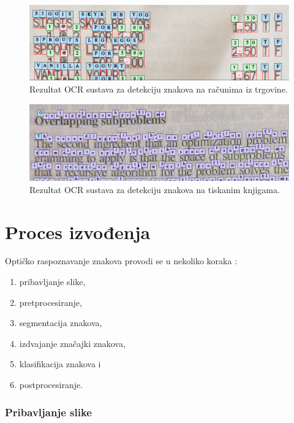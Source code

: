 \documentclass[times, utf8, zavrsni]{fer}
\begin{document}
\begin{figure}[htb]
    \centering
    \includegraphics[width=\textwidth]{images/receipt-example-01.png}
    \caption{Rezultat OCR sustava za detekciju znakova na računima iz trgovine.}
    \label{fig:receipt-example-01}
\end{figure}

\begin{figure}[htb]
    \centering
    \includegraphics[width=\textwidth]{images/book-example-01.png}
    \caption{Rezultat OCR sustava za detekciju znakova na tiskanim knjigama.}
    \label{fig:book-example-01}
\end{figure}

\pagebreak

\section{Proces izvođenja}

Optičko raspoznavanje znakova provodi se u nekoliko koraka \citep{DBLP:journals/corr/abs-1710-05703} \citep{kaur2016survey}:
\begin{enumerate}
    \item pribavljanje slike,
    \item pretprocesiranje,
    \item segmentacija znakova,
    \item izdvajanje značajki znakova,
    \item klasifikacija znakova i
    \item postprocesiranje.
\end{enumerate}

\subsubsection{Pribavljanje slike}
\end{document}
